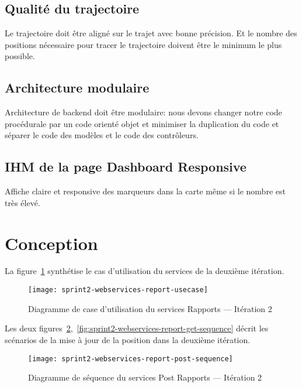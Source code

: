 \subsection{Qualité du trajectoire}

Le trajectoire doit être aligné sur le trajet avec bonne précision. Et le
nombre des positions nécessaire pour tracer le trajectoire doivent être le
minimum le plus possible.

\subsection{Architecture modulaire}

Architecture de backend doit être modulaire: nous devons changer notre code
procédurale par un code orienté objet et minimiser la duplication du code et
séparer le code des modèles et le code des contrôleurs.

\subsection{IHM de la page Dashboard Responsive}

Affiche claire et responsive des marqueurs dans la carte même si le nombre est
très élevé.

\section{Conception}

La figure~\ref{fig:sprint2-webservices-report-usecase} synthétise le cas
d'utilisation du services  de la deuxième itération.

\begin{figure}[H]
    \centering
    \texttt{[image: sprint2-webservices-report-usecase]}
    \caption{Diagramme de case d'utilisation du services Rapports --- Itération 2}
\label{fig:sprint2-webservices-report-usecase}
\end{figure}

Les deux
figures~\ref{fig:sprint2-webservices-report-post-sequence},~\ref{fig:sprint2-webservices-report-get-sequence}
décrit les scénarios de la mise à jour de la position dans la deuxième
itération.

\begin{figure}[H]
    \centering
    \texttt{[image: sprint2-webservices-report-post-sequence]}
    \caption{Diagramme de séquence du services Post Rapports --- Itération 2}
\label{fig:sprint2-webservices-report-post-sequence}
\end{figure}


